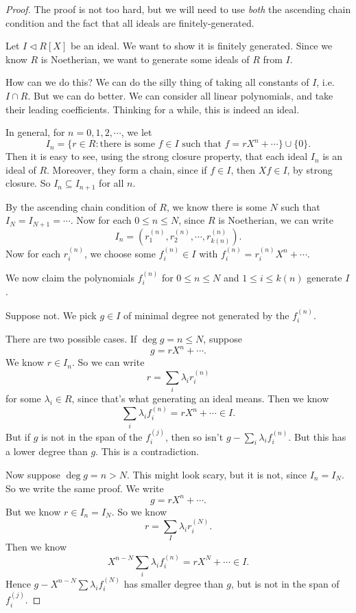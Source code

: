 \documentclass[a4paper]{article}
\begin{document}
\begin{proof}
  The proof is not too hard, but we will need to use \emph{both} the ascending chain condition and the fact that all ideals are finitely-generated.

  Let $I \lhd R[X]$ be an ideal. We want to show it is finitely generated. Since we know $R$ is Noetherian, we want to generate some ideals of $R$ from $I$.

  How can we do this? We can do the silly thing of taking all constants of $I$, i.e.\ $I \cap R$. But we can do better. We can consider all linear polynomials, and take their leading coefficients. Thinking for a while, this is indeed an ideal.

  In general, for $n = 0, 1, 2, \cdots$, we let
  \[
    I_n = \{r \in R: \text{there is some }f \in I\text{ such that }f = r X^n + \cdots\} \cup \{0\}.
  \]
  Then it is easy to see, using the strong closure property, that each ideal $I_n$ is an ideal of $R$. Moreover, they form a chain, since if $f \in I$, then $Xf \in I$, by strong closure. So $I_n \subseteq I_{n + 1}$ for all $n$.

  By the ascending chain condition of $R$, we know there is some $N$ such that $I_N = I_{N + 1} = \cdots$. Now for each $0 \leq n \leq N$, since $R$ is Noetherian, we can write
  \[
    I_n = (r_1^{(n)}, r_2^{(n)}, \cdots, r^{(n)}_{k(n)}).
  \]
  Now for each $r_i^{(n)}$, we choose some $f_i^{(n)} \in I$ with $f^{(n)}_i = r_i^{(n)} X^n + \cdots$.

  We now claim the polynomials $f_i^{(n)}$ for $0 \leq n \leq N$ and $1 \leq i \leq k(n)$ generate $I$.

  Suppose not. We pick $g \in I$ of minimal degree not generated by the $f_i^{(n)}$.

  There are two possible cases. If $\deg g = n \leq N$, suppose
  \[
    g = rX^n + \cdots.
  \]
  We know $r \in I_n$. So we can write
  \[
    r = \sum_i \lambda_i r^{(n)}_i
  \]
  for some $\lambda_i \in R$, since that's what generating an ideal means. Then we know
  \[
    \sum_i \lambda_i f_i^{(n)} = r X^n + \cdots \in I.
  \]
  But if $g$ is not in the span of the $f_i^{(j)}$, then so isn't $g - \sum_i \lambda_i f_i^{(n)}$. But this has a lower degree than $g$. This is a contradiction.

  Now suppose $\deg g = n > N$. This might look scary, but it is not, since $I_n = I_N$. So we write the same proof. We write
  \[
    g = r X^n + \cdots.
  \]
  But we know $r \in I_n = I_N$. So we know
  \[
    r = \sum_I \lambda_i r_i^{(N)}.
  \]
  Then we know
  \[
    X^{n - N}\sum_i \lambda_i f_i^{(n)} = r X^N + \cdots \in I.
  \]
  Hence $g - X^{n - N} \sum \lambda_i f^{(N)}_i$ has smaller degree than $g$, but is not in the span of $f_i^{(j)}$.
\end{proof}
\end{document}

